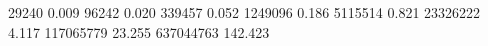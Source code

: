 29240     0.009
96242     0.020
339457    0.052
1249096   0.186
5115514   0.821
23326222  4.117
117065779 23.255
637044763 142.423
